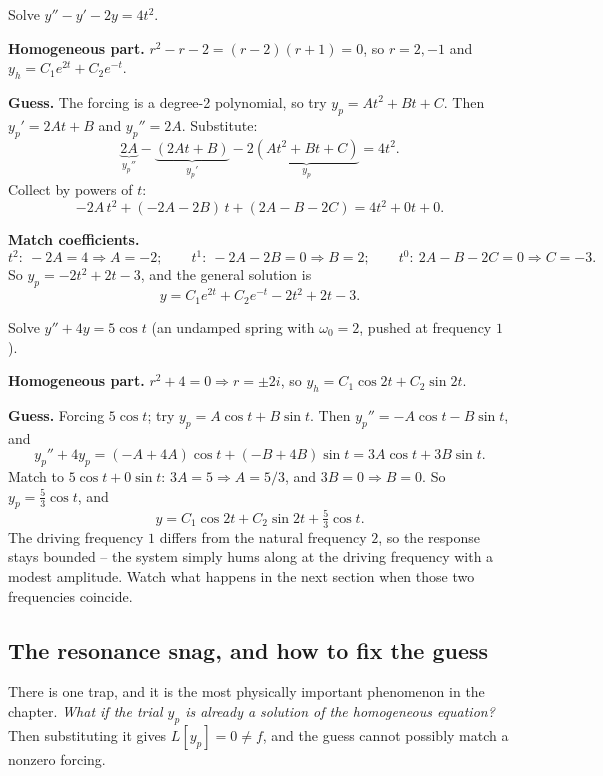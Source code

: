 \begin{example}
\label{ch38:ex-undetermined-poly}
Solve $y'' - y' - 2y = 4t^2$.

\textbf{Homogeneous part.} $r^2 - r - 2 = (r-2)(r+1) = 0$, so $r = 2, -1$ and
$y_h = C_1 e^{2t} + C_2 e^{-t}$.

\textbf{Guess.} The forcing is a degree-2 polynomial, so try $y_p = A t^2 + B t +
C$. Then $y_p' = 2At + B$ and $y_p'' = 2A$. Substitute:
\[
  \underbrace{2A}_{y_p''} - \underbrace{(2At + B)}_{y_p'} - 2\underbrace{(At^2 + Bt + C)}_{y_p}
  = 4t^2.
\]
Collect by powers of $t$:
\[
  -2A\,t^2 + (-2A - 2B)\,t + (2A - B - 2C) = 4t^2 + 0t + 0.
\]

\textbf{Match coefficients.}
\[
  t^2:\ -2A = 4 \Rightarrow A = -2; \qquad
  t^1:\ -2A - 2B = 0 \Rightarrow B = 2; \qquad
  t^0:\ 2A - B - 2C = 0 \Rightarrow C = -3.
\]
So $y_p = -2t^2 + 2t - 3$, and the general solution is
\[
  y = C_1 e^{2t} + C_2 e^{-t} - 2t^2 + 2t - 3.
\]
\end{example}

\begin{example}
\label{ch38:ex-undetermined-sin}
Solve $y'' + 4y = 5\cos t$ (an undamped spring with $\omega_0 = 2$, pushed at
frequency $1$).

\textbf{Homogeneous part.} $r^2 + 4 = 0 \Rightarrow r = \pm 2i$, so $y_h = C_1
\cos 2t + C_2 \sin 2t$.

\textbf{Guess.} Forcing $5\cos t$; try $y_p = A\cos t + B\sin t$. Then $y_p'' =
-A\cos t - B\sin t$, and
\[
  y_p'' + 4 y_p = (-A + 4A)\cos t + (-B + 4B)\sin t = 3A\cos t + 3B\sin t.
\]
Match to $5\cos t + 0\sin t$: $3A = 5 \Rightarrow A = 5/3$, and $3B = 0 \Rightarrow
B = 0$. So $y_p = \tfrac53 \cos t$, and
\[
  y = C_1 \cos 2t + C_2 \sin 2t + \tfrac{5}{3}\cos t.
\]
The driving frequency $1$ differs from the natural frequency $2$, so the response
stays bounded -- the system simply hums along at the driving frequency with a
modest amplitude. Watch what happens in the next section when those two
frequencies coincide.
\end{example}

\subsection*{The resonance snag, and how to fix the guess}

There is one trap, and it is the most physically important phenomenon in the
chapter. \emph{What if the trial $y_p$ is already a solution of the homogeneous
equation?} Then substituting it gives $L[y_p] = 0 \neq f$, and the guess cannot
possibly match a nonzero forcing.

